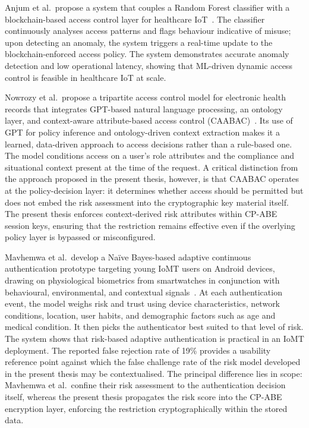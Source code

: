 Anjum et al.\ propose a system that couples a Random Forest classifier with a blockchain-based access control layer for healthcare IoT~\cite{anjum2025blockchain}. The classifier continuously analyses access patterns and flags behaviour indicative of misuse; upon detecting an anomaly, the system triggers a real-time update to the blockchain-enforced access policy. The system demonstrates accurate anomaly detection and low operational latency, showing that ML-driven dynamic access control is feasible in healthcare IoT at scale.

Nowrozy et al.\ propose a tripartite access control model for electronic health records that integrates GPT-based natural language processing, an ontology layer, and context-aware attribute-based access control (CAABAC)~\cite{nowrozy2025caabac}. Its use of GPT for policy inference and ontology-driven context extraction makes it a learned, data-driven approach to access decisions rather than a rule-based one. The model conditions access on a user's role attributes and the compliance and situational context present at the time of the request. A critical distinction from the approach proposed in the present thesis, however, is that CAABAC operates at the policy-decision layer: it determines whether access should be permitted but does not embed the risk assessment into the cryptographic key material itself. The present thesis enforces context-derived risk attributes within CP-ABE session keys, ensuring that the restriction remains effective even if the overlying policy layer is bypassed or misconfigured.

Mavhemwa et al.\ develop a Na\"{i}ve Bayes-based adaptive continuous authentication prototype targeting young IoMT users on Android devices, drawing on physiological biometrics from smartwatches in conjunction with behavioural, environmental, and contextual signals~\cite{mavhemwa2025naivebayes}. At each authentication event, the model weighs risk and trust using device characteristics, network conditions, location, user habits, and demographic factors such as age and medical condition. It then picks the authenticator best suited to that level of risk. The system shows that risk-based adaptive authentication is practical in an IoMT deployment. The reported false rejection rate of 19\% provides a usability reference point against which the false challenge rate of the risk model developed in the present thesis may be contextualised. The principal difference lies in scope: Mavhemwa et al.\ confine their risk assessment to the authentication decision itself, whereas the present thesis propagates the risk score into the CP-ABE encryption layer, enforcing the restriction cryptographically within the stored data.

